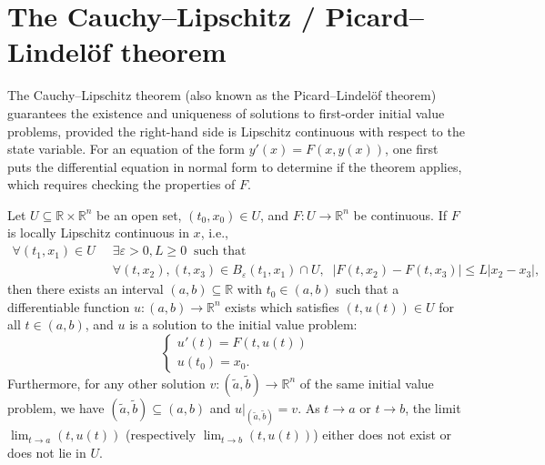 \section{The Cauchy--Lipschitz / Picard--Lindelöf theorem}
\label{sec:cauchy_lipschitz}

The Cauchy--Lipschitz theorem (also known as the Picard--Lindelöf theorem) guarantees the existence and uniqueness of solutions to first-order initial value problems, provided the right-hand side is Lipschitz continuous with respect to the state variable.
For an equation of the form $y'(x) = F(x, y(x))$, one first puts the differential equation in normal form to determine if the theorem applies, which requires checking the properties of $F$.

\begin{theorem}
\label{thm:picard_lindeloef_local}
Let $U \subseteq \mathbb{R} \times \mathbb{R}^n$ be an open set, $(t_0, x_0) \in U$, and $F: U \to \mathbb{R}^n$ be continuous. If $F$ is locally Lipschitz continuous in $x$, i.e.,
\begin{align*}
\forall (t_1, x_1) \in U \;\; &\exists \varepsilon > 0, L \geq 0 \;\; \text{such that} \\
&\forall (t, x_2), (t, x_3) \in B_\varepsilon(t_1, x_1) \cap U, \;\; |F(t, x_2) - F(t, x_3)| \leq L |x_2 - x_3|,
\end{align*}
then there exists an interval $(a, b) \subseteq \mathbb{R}$ with $t_0 \in (a, b)$ such that a differentiable function $u: (a, b) \to \mathbb{R}^n$ exists which satisfies $(t, u(t)) \in U$ for all $t \in (a, b)$, and $u$ is a solution to the initial value problem:
\[
\begin{cases}
  u'(t) = F(t, u(t)) \\
  u(t_0) = x_0.
\end{cases}
\]
Furthermore, for any other solution $v: (\tilde{a}, \tilde{b}) \to \mathbb{R}^n$ of the same initial value problem, we have $(\tilde{a}, \tilde{b}) \subseteq (a, b)$ and $u|_{(\tilde{a}, \tilde{b})} = v$. As $t \to a$ or $t \to b$, the limit $\lim_{t \to a} (t, u(t))$ (respectively $\lim_{t \to b} (t, u(t))$) either does not exist or does not lie in $U$.
\end{theorem}

